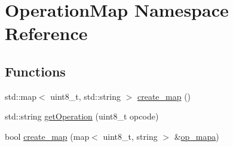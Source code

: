 \hypertarget{namespaceOperationMap}{\section{Operation\+Map Namespace Reference}
\label{namespaceOperationMap}
}
\subsection*{Functions}
\begin{DoxyCompactItemize}
\item 
std\+::map$<$ uint8\+\_\+t, std\+::string $>$ \hyperlink{namespaceOperationMap_a0413bfd4f988182beba0ff6259b0ee95}{create\+\_\+map} ()
\item 
std\+::string \hyperlink{namespaceOperationMap_a43fc0a6b71ddad200d8505ab17987674}{get\+Operation} (uint8\+\_\+t opcode)
\item 
bool \hyperlink{namespaceOperationMap_a2e3b57064aec19d39f33b0e11925cf80}{create\+\_\+map} (map$<$ uint8\+\_\+t, string $>$ \&\hyperlink{classOperationMap_a4972ca60ae534175e077cbdb21ee9707}{op\+\_\+mapa})
\end{DoxyCompactItemize}


